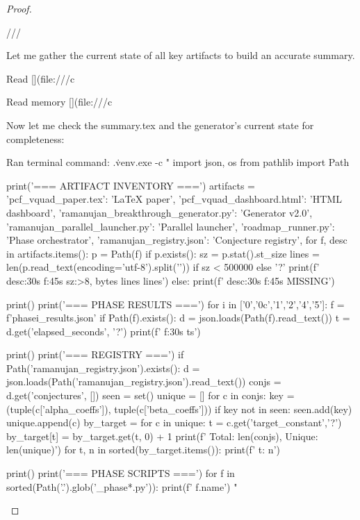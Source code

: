 \begin{theorem}
\begin{lemma}
\begin{proposition}
\begin{corollary}
\begin{proof}
\begin{remark}
///


Let me gather the current state of all key artifacts to build an accurate summary. 

Read [](file:///c%

Read memory [](file:///c%

Now let me check the summary.tex and the generator's current state for completeness: 

Ran terminal command: .\.venv\Scripts\python.exe -c "
import json, os
from pathlib import Path

print('=== ARTIFACT INVENTORY ===')
artifacts = {
    'pcf_vquad_paper.tex': 'LaTeX paper',
    'pcf_vquad_dashboard.html': 'HTML dashboard',
    'ramanujan_breakthrough_generator.py': 'Generator v2.0',
    'ramanujan_parallel_launcher.py': 'Parallel launcher',
    'roadmap_runner.py': 'Phase orchestrator',
    'ramanujan_registry.json': 'Conjecture registry',
}
for f, desc in artifacts.items():
    p = Path(f)
    if p.exists():
        sz = p.stat().st_size
        lines = len(p.read_text(encoding='utf-8').split('\n')) if sz < 500000 else '?'
        print(f'  {desc:30s} {f:45s} {sz:>8,} bytes  {lines} lines')
    else:
        print(f'  {desc:30s} {f:45s} MISSING')

print()
print('=== PHASE RESULTS ===')
for i in ['0','0c','1','2','4','5']:
    f = f'phase{i}_results.json'
    if Path(f).exists():
        d = json.loads(Path(f).read_text())
        t = d.get('elapsed_seconds', '?')
        print(f'  {f:30s} {t}s')

print()
print('=== REGISTRY ===')
if Path('ramanujan_registry.json').exists():
    d = json.loads(Path('ramanujan_registry.json').read_text())
    conjs = d.get('conjectures', [])
    seen = set()
    unique = []
    for c in conjs:
        key = (tuple(c['alpha_coeffs']), tuple(c['beta_coeffs']))
        if key not in seen:
            seen.add(key)
            unique.append(c)
    by_target = {}
    for c in unique:
        t = c.get('target_constant','?')
        by_target[t] = by_target.get(t, 0) + 1
    print(f'  Total: {len(conjs)}, Unique: {len(unique)}')
    for t, n in sorted(by_target.items()):
        print(f'    {t}: {n}')

print()
print('=== PHASE SCRIPTS ===')
for f in sorted(Path('.').glob('_phase*.py')):
    print(f'  {f.name}')
"



\end{remark}
\end{proof}
\end{corollary}
\end{proposition}
\end{lemma}
\end{theorem}
